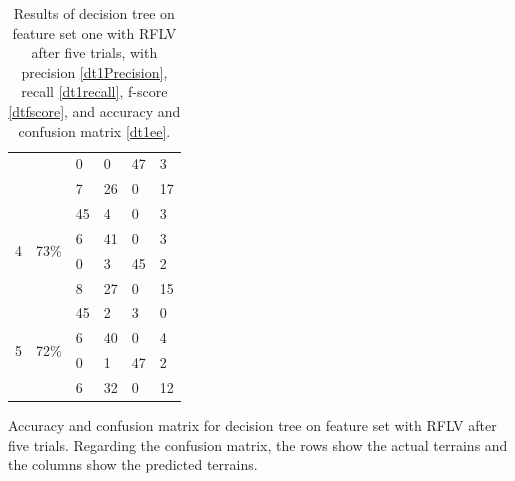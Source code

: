 \documentclass[USenglish]{ifimaster}  %
\begin{document}
\begin{table}[h]
\begin{subtable}[h]{1\textwidth}
\begin{tabular}{@{}llllll@{}}
			\multicolumn{1}{l|}{} & \multicolumn{1}{l|}{} & \multicolumn{1}{l|}{0} & \multicolumn{1}{l|}{0} & \multicolumn{1}{l|}{47} & 3 \\ \cmidrule(l){3-6} 
			\multicolumn{1}{l|}{} & \multicolumn{1}{l|}{} & \multicolumn{1}{l|}{7} & \multicolumn{1}{l|}{26} & \multicolumn{1}{l|}{0} & 17 \\ \midrule
			\multicolumn{1}{l|}{\multirow{4}{*}{4}} & \multicolumn{1}{l|}{\multirow{4}{*}{73\%}} & \multicolumn{1}{l|}{45} & \multicolumn{1}{l|}{4} & \multicolumn{1}{l|}{0} & 3 \\ \cmidrule(l){3-6} 
			\multicolumn{1}{l|}{} & \multicolumn{1}{l|}{} & \multicolumn{1}{l|}{6} & \multicolumn{1}{l|}{41} & \multicolumn{1}{l|}{0} & 3 \\ \cmidrule(l){3-6} 
			\multicolumn{1}{l|}{} & \multicolumn{1}{l|}{} & \multicolumn{1}{l|}{0} & \multicolumn{1}{l|}{3} & \multicolumn{1}{l|}{45} & 2 \\ \cmidrule(l){3-6} 
			\multicolumn{1}{l|}{} & \multicolumn{1}{l|}{} & \multicolumn{1}{l|}{8} & \multicolumn{1}{l|}{27} & \multicolumn{1}{l|}{0} & 15 \\ \midrule
			\multicolumn{1}{l|}{\multirow{4}{*}{5}} & \multicolumn{1}{l|}{\multirow{4}{*}{72\%}} & \multicolumn{1}{l|}{45} & \multicolumn{1}{l|}{2} & \multicolumn{1}{l|}{3} & 0 \\ \cmidrule(l){3-6} 
			\multicolumn{1}{l|}{} & \multicolumn{1}{l|}{} & \multicolumn{1}{l|}{6} & \multicolumn{1}{l|}{40} & \multicolumn{1}{l|}{0} & 4 \\ \cmidrule(l){3-6} 
			\multicolumn{1}{l|}{} & \multicolumn{1}{l|}{} & \multicolumn{1}{l|}{0} & \multicolumn{1}{l|}{1} & \multicolumn{1}{l|}{47} & 2 \\ \cmidrule(l){3-6} 
			\multicolumn{1}{l|}{} & \multicolumn{1}{l|}{} & \multicolumn{1}{l|}{6} & \multicolumn{1}{l|}{32} & \multicolumn{1}{l|}{0} & 12 \\ \bottomrule
		\end{tabular}
		\caption{Accuracy and confusion matrix for decision tree on feature set with RFLV after five trials. Regarding the confusion matrix, the rows show the actual terrains and the columns show the predicted terrains.}
		\label{dt1ee}
		\end{subtable}
	\caption[Results of SVM on feature set three with RFE]{Results of decision tree on feature set one with RFLV after five trials, with precision \ref{dt1Precision}, recall \ref{dt1recall}, f-score \ref{dtfscore}, and accuracy and confusion matrix \ref{dt1ee}.}
\label{dt44}
\end{table}
\FloatBarrier
\newpage
\end{document}
